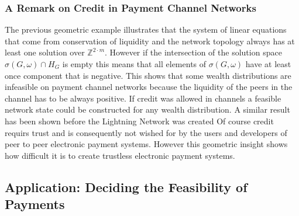 \documentclass[10pt,twocolumn]{article}
\begin{document}
\subsubsection{A Remark on Credit in Payment Channel Networks}
The previous geometric example illustrates that the system of linear equations that come from conservation of liquidity and the network topology always has at least one solution over $\mathbb{Z}^{2\cdot m}$.
However if the intersection of the solution space \(\sigma(G,\omega) \cap H_G\) is empty this means that all elements of $\sigma(G,\omega)$ have at least once component that is negative. 
This shows that some wealth distributions are infeasible on payment channel networks because the liquidity of the peers in the channel has to be always positive.
If credit was allowed in channels a feasible network state could be constructed for any wealth distribution.
A similar result has been shown before the Lightning Network was created \cite{dandekar2011liquidity}
Of course credit requirs trust and is consequently not wished for by the users and developers of peer to peer electronic payment systems.
However this geometric insight shows how difficult it is to create trustless electronic payment systems.


\subsection{Application: Deciding the Feasibility of Payments}


\end{document}
